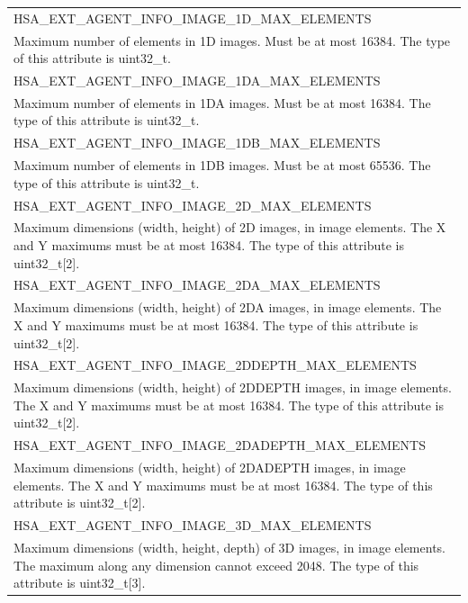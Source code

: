 \documentclass[final,oneside]{book}
\newcommand{\reftyp}[1]{#1}
\newcommand{\refenu}[1]{\reftyp{#1}}
\begin{document}
\begin{longtable}{@{\hspace{2em}}p{\linewidth-2em}}
\hspace{-2em}\refenu{HSA_\-EXT_\-AGENT_\-INFO_\-IMAGE_\-1D_\-MAX_\-ELEMENTS}\\Maximum number of elements in 1D images. Must be at most 16384. The type of this attribute is uint32_\-t.\\[2mm]
\hspace{-2em}\refenu{HSA_\-EXT_\-AGENT_\-INFO_\-IMAGE_\-1DA_\-MAX_\-ELEMENTS}\\Maximum number of elements in 1DA images. Must be at most 16384. The type of this attribute is uint32_\-t.\\[2mm]
\hspace{-2em}\refenu{HSA_\-EXT_\-AGENT_\-INFO_\-IMAGE_\-1DB_\-MAX_\-ELEMENTS}\\Maximum number of elements in 1DB images. Must be at most 65536. The type of this attribute is uint32_\-t.\\[2mm]
\hspace{-2em}\refenu{HSA_\-EXT_\-AGENT_\-INFO_\-IMAGE_\-2D_\-MAX_\-ELEMENTS}\\Maximum dimensions (width, height) of 2D images, in image elements. The X and Y maximums must be at most 16384. The type of this attribute is uint32_\-t[2].\\[2mm]
\hspace{-2em}\refenu{HSA_\-EXT_\-AGENT_\-INFO_\-IMAGE_\-2DA_\-MAX_\-ELEMENTS}\\Maximum dimensions (width, height) of 2DA images, in image elements. The X and Y maximums must be at most 16384. The type of this attribute is uint32_\-t[2].\\[2mm]
\hspace{-2em}\refenu{HSA_\-EXT_\-AGENT_\-INFO_\-IMAGE_\-2DDEPTH_\-MAX_\-ELEMENTS}\\Maximum dimensions (width, height) of 2DDEPTH images, in image elements. The X and Y maximums must be at most 16384. The type of this attribute is uint32_\-t[2].\\[2mm]
\hspace{-2em}\refenu{HSA_\-EXT_\-AGENT_\-INFO_\-IMAGE_\-2DADEPTH_\-MAX_\-ELEMENTS}\\Maximum dimensions (width, height) of 2DADEPTH images, in image elements. The X and Y maximums must be at most 16384. The type of this attribute is uint32_\-t[2].\\[2mm]
\hspace{-2em}\refenu{HSA_\-EXT_\-AGENT_\-INFO_\-IMAGE_\-3D_\-MAX_\-ELEMENTS}\\Maximum dimensions (width, height, depth) of 3D images, in image elements. The maximum along any dimension cannot exceed 2048. The type of this attribute is uint32_\-t[3].\\[2mm]

\end{longtable}
\end{document}
